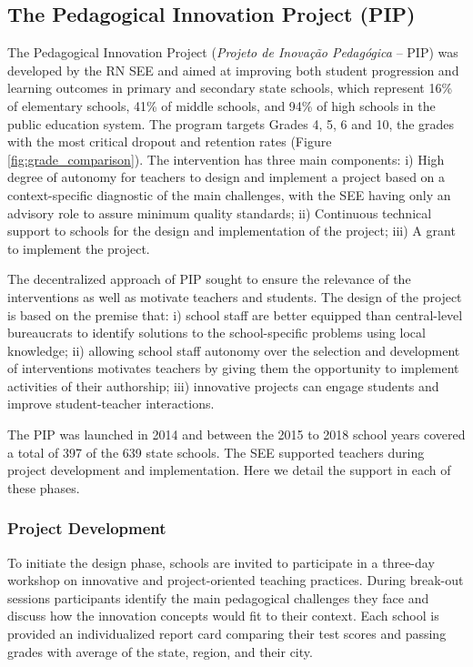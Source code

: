 \documentclass[11pt,a4paper]{article}
\begin{document}
\subsection{\textbf{The Pedagogical Innovation Project (PIP)}} \label{sec:pip}

The Pedagogical Innovation Project (\textit{Projeto de Inovação Pedagógica} -- PIP) was developed by the RN SEE and aimed at improving both student progression and learning outcomes in primary and secondary state schools, which represent 16\% of elementary schools, 41\% of middle schools, and 94\% of high schools in the public education system. The program targets Grades 4, 5, 6 and 10, the grades with the most critical dropout and retention rates (Figure \ref{fig:grade_comparison}). The intervention has three main components: i) High degree of autonomy for teachers to design and implement a project based on a context-specific diagnostic of the main challenges, with the SEE having only an advisory role to assure minimum quality standards; ii) Continuous technical support to schools for the design and implementation of the project; iii) A grant to implement the project. 

The decentralized approach of PIP sought to ensure the relevance of the interventions as well as motivate teachers and students. The design of the project is based on the premise that: i) school staff are better equipped than central-level bureaucrats to identify solutions to the school-specific problems using local knowledge; ii) allowing school staff autonomy over the selection and development of interventions motivates teachers by giving them the opportunity to implement activities of their authorship; iii) innovative projects can engage students and improve student-teacher interactions. 

The PIP was launched in 2014 and between the 2015 to 2018 school years covered a total of 397 of the 639 state schools. The SEE supported teachers during project development and implementation. Here we detail the support in each of these phases.  

\subsubsection*{Project Development} \label{sec:project}

To initiate the design phase, schools are invited to participate in a three-day workshop on innovative and project-oriented teaching practices. During break-out sessions participants identify the main pedagogical challenges they face and discuss how the innovation concepts would fit to their context. Each school is provided an individualized report card comparing their test scores and passing grades with average of the state, region, and their city.
\end{document}
